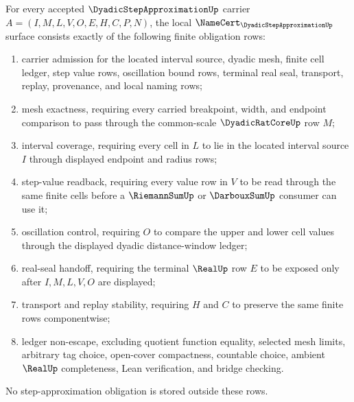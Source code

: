 \begin{theorem}
\label{thm:dyadic-step-approximation-obligation-surface}
For every accepted $\DyadicStepApproximationUp$ carrier $A=(I,M,L,V,O,E,H,C,P,N)$, the local $\NameCert_{\DyadicStepApproximationUp}$ surface consists exactly of the following finite obligation rows:
\begin{enumerate}
\item carrier admission for the located interval source, dyadic mesh, finite cell ledger, step value rows, oscillation bound rows, terminal real seal, transport, replay, provenance, and local naming rows;
\item mesh exactness, requiring every carried breakpoint, width, and endpoint comparison to pass through the common-scale $\DyadicRatCoreUp$ row $M$;
\item interval coverage, requiring every cell in $L$ to lie in the located interval source $I$ through displayed endpoint and radius rows;
\item step-value readback, requiring every value row in $V$ to be read through the same finite cells before a $\RiemannSumUp$ or $\DarbouxSumUp$ consumer can use it;
\item oscillation control, requiring $O$ to compare the upper and lower cell values through the displayed dyadic distance-window ledger;
\item real-seal handoff, requiring the terminal $\RealUp$ row $E$ to be exposed only after $I,M,L,V,O$ are displayed;
\item transport and replay stability, requiring $H$ and $C$ to preserve the same finite rows componentwise;
\item ledger non-escape, excluding quotient function equality, selected mesh limits, arbitrary tag choice, open-cover compactness, countable choice, ambient $\RealUp$ completeness, Lean verification, and bridge checking.
\end{enumerate}
No step-approximation obligation is stored outside these rows.
\end{theorem}
